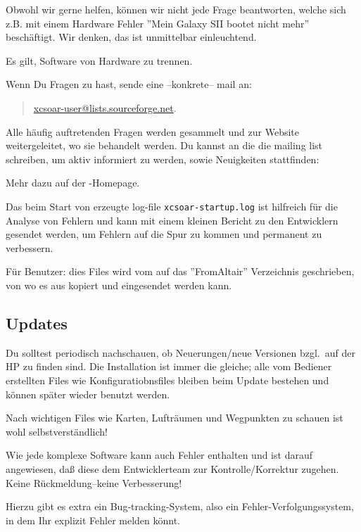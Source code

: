 Obwohl wir gerne helfen, können wir nicht jede Frage beantworten, welche sich z.B. mit einem
Hardware Fehler ''Mein  Galaxy SII bootet nicht mehr'' beschäftigt. Wir denken, das ist unmittelbar einleuchtend.

Es gilt, Software von Hardware zu trennen.

Wenn Du Fragen zu \xc hast, sende eine --konkrete-- mail an:

\begin{quote}
\url{xcsoar-user@lists.sourceforge.net}.
\end{quote}

Alle häufig auftretenden Fragen werden gesammelt und zur Website weitergeleitet, wo sie behandelt werden.
Du kannst an die die mailing list schreiben, um aktiv informiert zu werden, sowie Neuigkeiten stattfinden:

Mehr dazu auf der \xc-Homepage.

\begin{quote}
\xcsoarwebsite
\end{quote}

Das beim Start von \xc erzeugte log-file \verb|xcsoar-startup.log| ist hilfreich für die Analyse von Fehlern und kann
mit einem kleinen Bericht zu den Entwicklern gesendet werden, um Fehlern auf die Spur zu kommen
und \xc permanent zu verbessern.

Für \al Benutzer: dies Files wird vom \al auf das ''FromAltair'' Verzeichnis geschrieben, von wo es aus kopiert
und eingesendet werden kann.

\subsection*{Updates}
Du solltest periodisch nachschauen, ob Neuerungen/neue Versionen  bzgl.\ \xc auf der HP zu finden sind.
Die Installation ist immer die gleiche; alle vom Bediener erstellten Files wie Konfiguratiobnsfiles
bleiben beim Update bestehen und können später wieder benutzt werden.

Nach wichtigen Files wie Karten, Lufträumen und Wegpunkten zu schauen ist wohl selbstverständlich!


Wie jede komplexe Software kann auch \xc Fehler enthalten und ist \xc darauf angewiesen, daß diese dem Entwicklerteam zur
Kontrolle/Korrektur zugehen. Keine Rückmeldung--keine Verbesserung!

Hierzu gibt es extra ein Bug-tracking-System, also ein Fehler-Verfolgungssystem, in dem Ihr explizit Fehler melden könnt.

